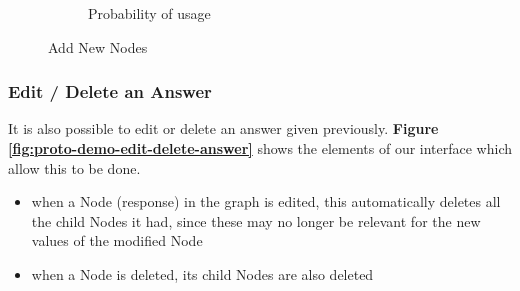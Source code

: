 \begin{figure}[h]
\begin{subfigure}[b]{0.45\textwidth}
            \caption{\label{fig:proto-demo-add-answer-proba} Probability of usage}
        \end{subfigure}
        \caption{\label{fig:add-node}  Add New Nodes}
    \end{figure}
    
    
    \subsubsection{Edit / Delete an Answer}
    It is also possible to edit or delete an answer given previously. \textbf{Figure \ref{fig:proto-demo-edit-delete-answer}} shows the elements of our interface which allow this to be done. 
    
    \begin{itemize}
        \item when a Node (response) in the graph is edited, this automatically deletes all the child Nodes it had, since these may no longer be relevant for the new values of the modified Node
        \item when a Node is deleted, its child Nodes are also deleted
    \end{itemize}

